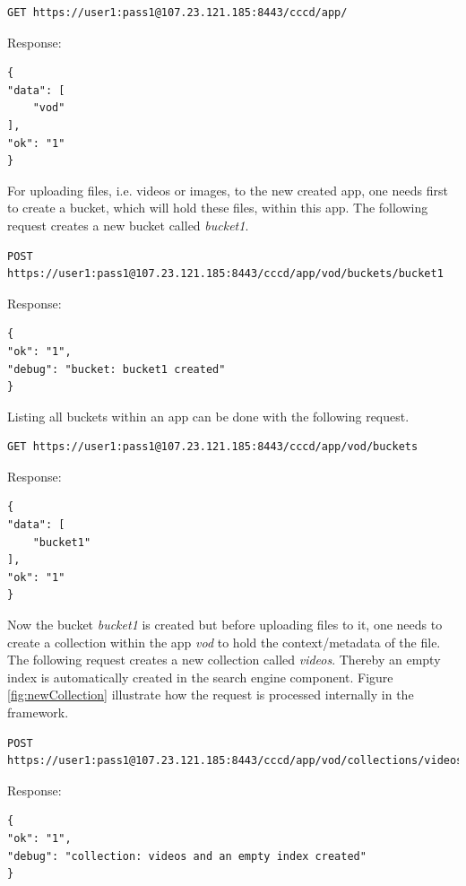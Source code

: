 \begin{code}
\begin{verbatim}
GET https://user1:pass1@107.23.121.185:8443/cccd/app/
\end{verbatim}
Response:
\begin{verbatim}
{
"data": [
	"vod"
],
"ok": "1"
}
\end{verbatim}
\end{code}
 
For uploading files, i.e. videos or images, to the new created app, one needs first to create a bucket, which will hold these files, within this app. The following request creates a new bucket called \textit{bucket1}.

\begin{code}
\begin{verbatim}
POST https://user1:pass1@107.23.121.185:8443/cccd/app/vod/buckets/bucket1
\end{verbatim}
Response:
\begin{verbatim}
{
"ok": "1",
"debug": "bucket: bucket1 created"
}
\end{verbatim}
\end{code}

Listing all buckets within an app can be done with the following request.
\begin{code}
\begin{verbatim}
GET https://user1:pass1@107.23.121.185:8443/cccd/app/vod/buckets
\end{verbatim}
Response:
\begin{verbatim}
{
"data": [
	"bucket1"
],
"ok": "1"
}
\end{verbatim}
\end{code}

Now the bucket \textit{bucket1} is created but before uploading files to it, one needs to create a collection within the app \textit{vod} to hold the context/metadata of the file. The following request creates a new collection called \textit{videos}. Thereby an empty index is automatically created in the search engine component. Figure \ref{fig:newCollection} illustrate how the request is processed internally in the framework.

\begin{code}
\begin{verbatim}
POST https://user1:pass1@107.23.121.185:8443/cccd/app/vod/collections/videos
\end{verbatim}
Response:
\begin{verbatim}
{
"ok": "1",
"debug": "collection: videos and an empty index created"
}
\end{verbatim}
\end{code}

